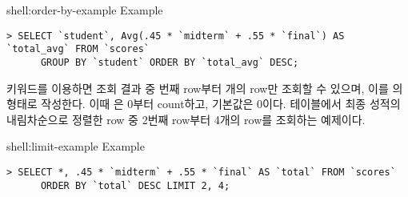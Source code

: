 \begin{shell}{shell:order-by-example}{ Example}
\begin{verbatim}
> SELECT `student`, Avg(.45 * `midterm` + .55 * `final`) AS `total_avg` FROM `scores`
      GROUP BY `student` ORDER BY `total_avg` DESC;
\end{verbatim}
\end{shell}

 키워드를 이용하면 조회 결과 중 번째 row부터 개의 row만 조회할 수 있으며, 이를 의 형태로 작성한다. 이때 은 0부터 count하고, 기본값은 0이다. \은  테이블에서 최종 성적의 내림차순으로 정렬한 row 중 2번째 row부터 4개의 row를 조회하는 예제이다.

\begin{shell}{shell:limit-example}{ Example}
\begin{verbatim}
> SELECT *, .45 * `midterm` + .55 * `final` AS `total` FROM `scores`
      ORDER BY `total` DESC LIMIT 2, 4;
\end{verbatim}
\end{shell}
